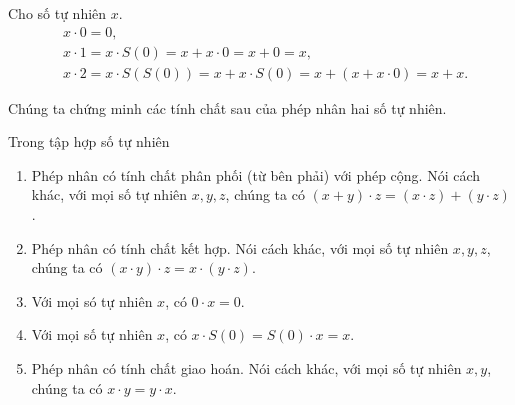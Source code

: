 \begin{example}
    Cho số tự nhiên $x$.
    \begin{align*}
         & x \cdot 0 = 0,                                                             \\
         & x \cdot 1 = x\cdot S(0) = x + x\cdot 0 = x + 0 = x,                        \\
         & x \cdot 2 = x\cdot S(S(0)) = x + x\cdot S(0) = x + (x + x\cdot 0) = x + x.
    \end{align*}
\end{example}

Chúng ta chứng minh các tính chất sau của phép nhân hai số tự nhiên.

\begin{theorem}\label{theorem:property-of-natural-numbers-multiplication}
    Trong tập hợp số tự nhiên
    \begin{enumerate}[label={(\roman*)}]
        \item Phép nhân có tính chất phân phối (từ bên phải) với phép cộng. Nói cách khác, với mọi số tự nhiên $x, y, z$, chúng ta có $(x + y)\cdot z = (x\cdot z) + (y\cdot z)$.
        \item Phép nhân có tính chất kết hợp. Nói cách khác, với mọi số tự nhiên $x, y, z$, chúng ta có $(x \cdot y) \cdot z = x \cdot (y \cdot z)$.
        \item Với mọi só tự nhiên $x$, có $0\cdot x = 0$.
        \item Với mọi số tự nhiên $x$, có $x\cdot S(0) = S(0) \cdot x = x$.
        \item Phép nhân có tính chất giao hoán. Nói cách khác, với mọi số tự nhiên $x, y$, chúng ta có $x \cdot y = y \cdot x$.
    \end{enumerate}
\end{theorem}

